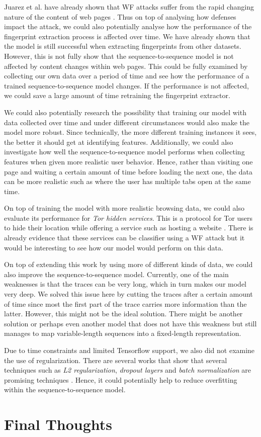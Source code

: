 Juarez et al. have already shown that WF attacks suffer from the rapid changing nature of the content of web pages \cite{wfpevaluation}.
Thus on top of analysing how defenses impact the attack, we could also potentially analyse how the performance of the fingerprint extraction process is affected over time.
We have already shown that the model is still successful when extracting fingerprints from other datasets. %
However, this is not fully show that the sequence-to-sequence model is not affected by content changes within web pages.
This could be fully examined by collecting our own data over a period of time and see how the performance of a trained sequence-to-sequence model changes.
If the performance is not affected, we could save a large amount of time retraining the fingerprint extractor.

We could also potentially research the possibility that training our model with data collected over time and under different circumstances would also make the model more robust.
Since technically, the more different training instances it sees, the better it should get at identifying features.
Additionally, we could also investigate how well the sequence-to-sequence model performs when collecting features when given more realistic user behavior.
Hence, rather than visiting one page and waiting a certain amount of time before loading the next one, the data can be more realistic such as where the user has multiple tabs open at the same time.

On top of training the model with more realistic browsing data, we could also evaluate its performance for \textit{Tor hidden services}.
This is a protocol for Tor users to hide their location while offering a service such as hosting a website \cite{tor_hidden_services}.
There is already evidence that these services can be classifier using a WF attack \cite{kfingerprinting} but it would be interesting to see how our model would perform on this data.

On top of extending this work by using more of different kinds of data, we could also improve the sequence-to-sequence model.
Currently, one of the main weaknesses is that the traces can be very long, which in turn makes our model very deep.
We solved this issue here by cutting the traces after a certain amount of time since most the first part of the trace carries more information than the latter.
However, this might not be the ideal solution.
There might be another solution or perhaps even another model that does not have this weakness but still manages to map variable-length sequences into a fixed-length representation.

Due to time constraints and limited Tensorflow support, we also did not examine the use of regularization.
There are several works that show that several techniques such as \textit{L2 regularization}, \textit{dropout layers} and \textit{batch normalization} are promising techniques \cite{ioffe2015batch,nielsen_2017}.
Hence, it could potentially help to reduce overfitting within the sequence-to-sequence model.

\section{Final Thoughts}
